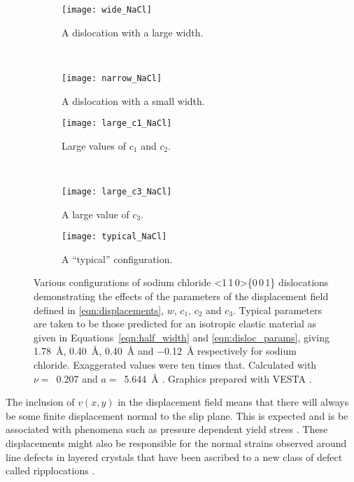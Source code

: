 \begin{figure}
\centering

    \begin{subfigure}{0.4\textwidth}
    \centering
    \texttt{[image: wide\_NaCl]}
    \caption{A dislocation with a large width.}
    \end{subfigure}
    ~
    \begin{subfigure}{0.4\textwidth}
    \centering
    \texttt{[image: narrow\_NaCl]}
    \caption{A dislocation with a small width.}
    \end{subfigure}

	\begin{subfigure}{0.4\textwidth}
	\centering
    \texttt{[image: large\_c1\_NaCl]}
    \caption{Large values of $c_1$ and $c_2$.}
	\end{subfigure}
    ~
	\begin{subfigure}{0.4\textwidth}
	\centering
    \texttt{[image: large\_c3\_NaCl]}
    \caption{A large value of $c_3$.}
	\end{subfigure}

    \begin{subfigure}{0.8\textwidth}
    \centering
    \texttt{[image: typical\_NaCl]}
    \caption{A ``typical'' configuration.}
    \end{subfigure}

\captionsetup{width=0.8\textwidth}
\caption[The displacement field around an edge dislocation in rock salt.]{Various configurations of sodium chloride <1\,1\,0>\{0\,0\,1\} dislocations demonstrating the effects of the parameters of the displacement field defined in \autoref{eqn:displacements}, $w$, $c_1$, $c_2$ and $c_3$. Typical parameters are taken to be those predicted for an isotropic elastic material as given in  Equations~\ref{eqn:half_width} and \ref{eqn:disloc_params}, giving \SI{1.78}{\angstrom}, \SI{0.40}{\angstrom}, \SI{0.40}{\angstrom} and \SI{-0.12}{\angstrom} respectively for sodium chloride. Exaggerated values were ten times that. Calculated with $\nu =$~\num{0.207} and $a =$~\SI{5.644}{\angstrom} \cite{Theocaris1994,Rao1990}. Graphics prepared with VESTA \cite{Momma2011}.\label{fig:parameters_of_the_disloc_configuration}}
\end{figure}


The inclusion of $v(x,y)$ in the displacement field means that there will always be some finite displacement normal to the slip plane. This is expected and is be associated with phenomena such as pressure dependent yield stress \cite{frost1982pressure}. These displacements might also be responsible for the normal strains observed around line defects in layered crystals that have been ascribed to  a new class of defect called ripplocations \cite{Gruber2016}.





